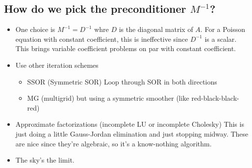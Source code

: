 \documentclass{article}
\begin{document}
        \subsection{How do we pick the preconditioner $M^{-1}$?}
            \begin{itemize}
                \item One choice is $M^{-1} = D^{-1}$ whre $D$ is the diagonal matrix of $A$.  For a Poisson equation with constant coefficient, this is ineffective since $D^{-1}$ is a scalar.  This brings variable coefficient problems on par with constant coefficient.
                \item Use other iteration schemes
                \begin{itemize}
                    \item SSOR (Symmetric SOR) Loop through SOR in both directions
                    \item MG (multigrid) but using a symmetric smoother (like red-black-black-red)
                \end{itemize}
                \item Approximate factorizations (incomplete LU or incomplete Cholesky)  This is just doing a little Gauss-Jordan elimination and just stopping midway.  These are nice since they're algebraic, so it's a know-nothing algorithm.
                \item The sky's the limit.
            \end{itemize}
\end{document}
